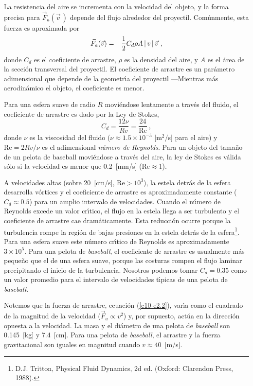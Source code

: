 La resistencia del aire se incrementa con la velocidad del objeto, y
la forma precisa para $\vec F_a(\vec v\,)$ depende del flujo alrededor
del proyectil. Com{\'u}nmente, esta fuerza es aproximada por
\begin{equation}
\label{c10-e2.2}
\vec F_a(\vec v)= -\frac 12 C_d \rho A \left\lvert\, v \,\right\lvert \vec v\ ,
\end{equation}
donde $C_d$ es el coeficiente de arrastre, $\rho$ es la densidad del
aire, y $A$ es el {\'a}rea de la secci{\'o}n transversal del proyectil. El
coeficiente de arrastre es un par{\'a}metro adimensional que depende de la
geometr{\'\i}a del proyectil ---Mientras m{\'a}s aerodin{\'a}mico el objeto, el
coeficiente es menor.

Para una esfera suave de radio $R$ movi{\'e}ndose lentamente a trav{\'e}s del
fluido, el coeficiente de arrastre es dado por la Ley de Stokes,
\begin{equation}
\label{c10-e2.3}
C_d=\frac{12\nu}{Rv}=\frac{24}{\text{Re}}\ ,
\end{equation}
donde $\nu$ es la viscosidad del fluido ($\nu \approx 1.5\times10^{-5}$ [m$^2$/s]
para el aire) y $\text{Re}=2Rv/\nu$ es el adimensional {\em n{\'u}mero de
  Reynolds}. Para un objeto del tama{\~n}o de un pelota de baseball
movi{\'e}ndose a trav{\'e}s del aire, la ley de Stokes es v{\'a}lida s{\'o}lo si la
velocidad es menor que 0.2~[mm/s] ($\text{Re}\approx1$).

A velocidades altas (sobre 20~[cm/s], $\text{Re}>10^3$), la estela detr{\'a}s de
la esfera desarrolla v{\'o}rtices y el coeficiente de arrastre es
aproximadamente constante ($C_d\approx0.5$) para un amplio intervalo de
velocidades. Cuando el n{\'u}mero de Reynolds excede un valor cr{\'\i}tico, el
flujo en la estela llega a ser turbulento y el coeficiente de arrastre
cae dram{\'a}ticamente. Esta reducci{\'o}n ocurre porque la turbulencia rompe
la regi{\'o}n de bajas presiones en la estela detr{\'a}s de la
esfera\footnote{D.J. Tritton, {Physical Fluid Dynamics}, 2d ed.
  (Oxford: Clarendon Press, 1988).}. Para una esfera suave este n{\'u}mero
cr{\'\i}tico de Reynolds es aproximadamente $3\times10^5$. Para una pelota de
{\em baseball}, el coeficiente de arrastre es usualmente m{\'a}s peque{\~n}o
que el de una esfera suave, porque las costuras rompen el flujo
laminar precipitando el inicio de la turbulencia. Nosotros podemos
tomar $C_d=0.35$ como un valor promedio para el intervalo de
velocidades t{\'\i}picas de una pelota de {\em baseball}.

Notemos que la fuerza de arrastre, ecuaci{\'o}n (\ref{c10-e2.2}), var{\'\i}a
como el cuadrado de la magnitud de la velocidad ($\vec F_a\propto v^2$) y,
por supuesto, act{\'u}a en la direcci{\'o}n opuesta a la velocidad. La masa y
el di\'ametro de una pelota de {\em baseball} son 0.145~[kg] y 7.4~[cm].
Para una pelota de {\em baseball}, el arrastre y la fuerza
gravitacional son iguales en magnitud cuando $v\approx40$~[m/s].

